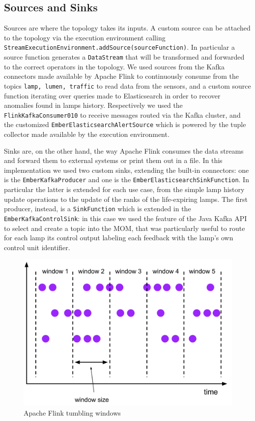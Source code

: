 \subsection{Sources and Sinks}
Sources are where the topology takes its inputs. A custom source can be attached to the topology via the execution environment calling \texttt{StreamExecutionEnvironment.addSource(sourceFunction)}. In particular a source function generates a \texttt{DataStream} that will be transformed and forwarded to the correct operators in the topology. We used sources from the Kafka connectors made available by Apache Flink to continuously consume from the topics \texttt{lamp, lumen, traffic} to read data from the sensors, and a custom source function iterating over queries made to Elasticsearch in order to recover anomalies found in lamps history. Respectively we used the \texttt{FlinkKafkaConsumer010} to receive messages routed via the Kafka cluster, and the customized \texttt{EmberElasticsearchAlertSource} which is powered by the tuple collector made available by the execution environment.

Sinks are, on the other hand, the way Apache Flink consumes the data streams and forward them to external systems or print them out in a file. In this implementation we used two custom sinks, extending the built-in connectors: one is the \texttt{EmberKafkaProducer} and one is the \texttt{EmberElasticsearchSinkFunction}. In particular the latter is extended for each use case, from the simple lamp history update operations to the update of the ranks of the life-expiring lamps. The first producer, instead, is a \texttt{SinkFunction} which is extended in the \texttt{EmberKafkaControlSink}: in this case we used the feature of the Java Kafka API to select and create a topic into the MOM, that was particularly useful to route for each lamp its control output labeling each feedback with the lamp's own control unit identifier.


\begin{figure}
\begin{center}
	\includegraphics[scale=0.30]{img/flink_windows}
	\caption{Apache Flink tumbling windows}
	\label{fig:flink_windows}
\end{center}
\end{figure}


